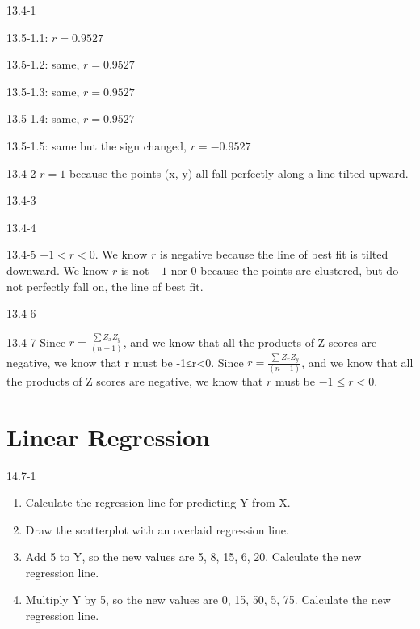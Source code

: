 \begin{exsol@solution}{13.4-1}


13.5-1.1: $r = 0.9527 $

13.5-1.2: same, $r = 0.9527 $

13.5-1.3: same, $r = 0.9527 $

13.5-1.4: same, $r = 0.9527 $

13.5-1.5: same but the sign changed, $r = -0.9527 $

\end{exsol@solution}
\begin{exsol@solution}{13.4-2}
$r = 1$ because the points (x, y) all fall perfectly along a line tilted upward.

\end{exsol@solution}
\begin{exsol@solution}{13.4-3}
\end{exsol@solution}
\begin{exsol@solution}{13.4-4}

\end{exsol@solution}
\begin{exsol@solution}{13.4-5}
$ -1 < r < 0$. We know $r$ is negative because the line of best fit is tilted downward. We know $r$ is not $-1$ nor $0$ because the points are clustered, but do not perfectly fall on, the line of best fit.

\end{exsol@solution}
\begin{exsol@solution}{13.4-6}
\end{exsol@solution}
\begin{exsol@solution}{13.4-7}
Since $ r = \frac{ \sum Z_x Z_y}{(n - 1)}$, and we know that all the products of Z scores are negative, we know that r must be -1≤r<0. Since $ r = \frac{ \sum Z_x Z_y}{(n - 1)}$, and we know that all the products of Z scores are negative, we know that $r$ must be $-1 \le r < 0$.
\end{exsol@solution}
\setcounter{chapter}{14}\chapter{Linear Regression}
\begin{exsol@solution}{14.7-1}
\begin{enumerate}
  \item Calculate the regression line for predicting Y from X.
  \item Draw the scatterplot with an overlaid regression line.
  \item Add 5 to Y, so the new values are 5, 8, 15, 6, 20.  Calculate the new regression line.
  \item Multiply Y by 5, so the new values are 0, 15, 50, 5, 75.  Calculate the new regression line.
\end{enumerate}

\end{exsol@solution}
